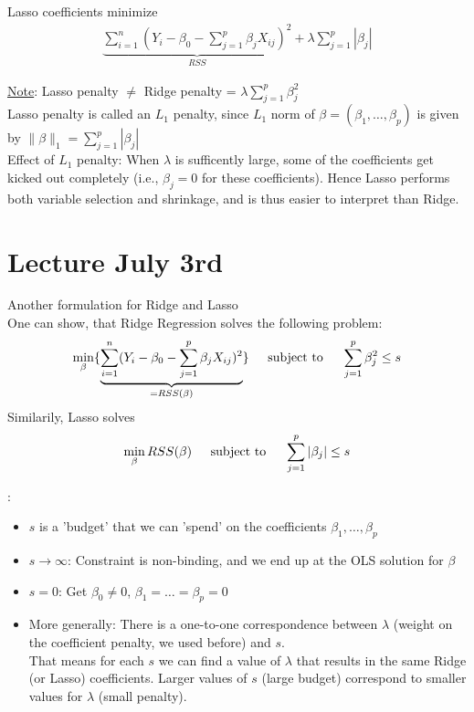 \documentclass[11pt,a4paper,numbers=endperiod]{scrartcl}
\newcommand{\id}{\hspace*{4mm}}
\newcommand{\tit}[1]{\begin{large} \underline{\text{#1}}\end{large}}
\begin{document}
{Lasso coefficients minimize \begin{align*}
	\underbrace{\sum\limits_{i = 1}^n (Y_i - \beta_0 - \sum_{j = 1}^p \beta_j X_{ij})^2}_{RSS} + \lambda \sum\limits_{j = 1}^p |\beta_j|
\end{align*}

\underline{Note}: Lasso penalty $\neq$ Ridge penalty = $\lambda \sum\limits_{j = 1}^p \beta_j^2$\\
Lasso penalty is called an $L_1$ penalty, since $L_1$ norm of $\beta = (\beta_1, \ldots, \beta_p)$ is given by $\| \beta\|_1 = \sum\limits_{j = 1}^p |\beta_j|$\\

Effect of $L_1$ penalty: When $\lambda$ is sufficently large, some of the coefficients get kicked out completely (i.e., $\beta_j = 0$ for these coefficients). Hence Lasso performs both variable selection and shrinkage, and is thus easier to interpret than Ridge.

\section{Lecture July 3rd}

Another formulation for Ridge and Lasso\\
One can show, that Ridge Regression solves the following problem: \begin{align*}
	\min\limits_{\beta} \{ \underbrace{\sum\limits_{i = 1}^n (Y_i - \beta_0 - \sum\limits_{j = 1}^p \beta_j X_{ij})^2}_{= RSS(\beta)}\} \id \text{ subject to } \id \sum\limits_{j = 1}^p \beta_j^2 \leq s
\end{align*}
Similarily, Lasso solves \begin{align*}
	\min\limits_\beta RSS(\beta) \id \text{ subject to } \id \sum\limits_{j = 1}^p |\beta_j| \leq s
\end{align*}

\tit{Notes}: \begin{itemize}
	\item $s$ is a 'budget' that we can 'spend' on the coefficients $\beta_1, \ldots, \beta_p$
	\item  $s \to \infty$: Constraint is non-binding, and we end up at the OLS solution for $\beta$
	\item $s = 0$: Get $\beta_0 \neq 0$, $\beta_1 = \ldots = \beta_p = 0$
	\item More generally: There is a one-to-one correspondence between $\lambda$ (weight on the coefficient penalty, we used before) and $s$.\\
	That means for each $s$ we can find a value of $\lambda$ that results in the same Ridge (or Lasso) coefficients. Larger values of $s$ (large budget) correspond to smaller values for $\lambda$ (small penalty).
\end{itemize}

}
\end{document}
